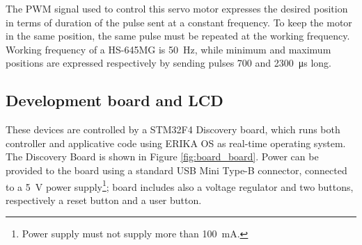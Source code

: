 The PWM signal used to control this servo motor expresses the desired position in terms of duration of the pulse sent at a constant frequency. To keep the motor in the same position, the same pulse must be repeated at the working frequency. Working frequency of a HS-645MG is \SI{50}{\hertz}, while minimum and maximum positions are expressed respectively by sending pulses \si{700} and \SI{2300}{\micro\second} long.



\subsection{Development board and LCD}

These devices are controlled by a STM32F4 Discovery board, which runs both controller and applicative code using ERIKA OS as real-time operating system. The Discovery Board is shown in Figure \ref{fig:board_board}. Power can be provided to the board using a standard USB Mini Type-B connector, connected to a \SI{5}{V} power supply\footnote{Power supply must not supply more than \SI{100}{\milli\ampere}.}; board includes also a voltage regulator and two buttons, respectively a reset button and a user button.



